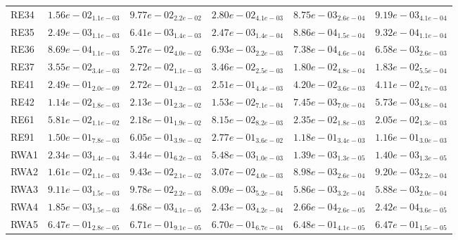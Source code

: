 \documentclass{article}
\begin{document}
\begin{table}
\begin{scriptsize}
\begin{tabular}{llllll}
RE34 & $  1.56e-02_{ 1.1e-03}$ & $  9.77e-02_{ 2.2e-02}$ & $  2.80e-02_{ 4.1e-03}$ & \cellcolor{gray95}$  8.75e-03_{ 2.6e-04}$ & \cellcolor{gray25}$  9.19e-03_{ 4.1e-04}$ \\
RE35 & $  2.49e-03_{ 1.1e-03}$ & $  6.41e-03_{ 1.4e-03}$ & $  2.47e-03_{ 1.4e-04}$ & \cellcolor{gray95}$  8.86e-04_{ 1.5e-04}$ & \cellcolor{gray25}$  9.32e-04_{ 1.1e-04}$ \\
RE36 & \cellcolor{gray25}$  8.69e-04_{ 1.1e-03}$ & $  5.27e-02_{ 4.0e-02}$ & $  6.93e-03_{ 2.2e-03}$ & \cellcolor{gray95}$  7.38e-04_{ 4.6e-04}$ & $  6.58e-03_{ 2.6e-03}$ \\
RE37 & $  3.55e-02_{ 3.4e-03}$ & $  2.72e-02_{ 1.1e-03}$ & $  3.46e-02_{ 2.5e-03}$ & \cellcolor{gray95}$  1.80e-02_{ 4.8e-04}$ & \cellcolor{gray25}$  1.83e-02_{ 5.5e-04}$ \\
RE41 & $  2.49e-01_{ 2.0e-09}$ & $  2.72e-01_{ 4.2e-03}$ & $  2.51e-01_{ 4.4e-03}$ & \cellcolor{gray25}$  4.20e-02_{ 3.6e-03}$ & \cellcolor{gray95}$  4.11e-02_{ 4.7e-03}$ \\
RE42 & $  1.14e-02_{ 1.8e-03}$ & $  2.13e-01_{ 2.3e-02}$ & $  1.53e-02_{ 7.1e-04}$ & \cellcolor{gray25}$  7.45e-03_{ 7.0e-04}$ & \cellcolor{gray95}$  5.73e-03_{ 4.8e-04}$ \\
RE61 & $  5.81e-02_{ 1.1e-02}$ & $  2.18e-01_{ 1.9e-02}$ & $  8.15e-02_{ 8.2e-03}$ & \cellcolor{gray25}$  2.35e-02_{ 1.8e-03}$ & \cellcolor{gray95}$  2.05e-02_{ 1.3e-03}$ \\
RE91 & $  1.50e-01_{ 7.8e-03}$ & $  6.05e-01_{ 3.9e-02}$ & $  2.77e-01_{ 3.6e-02}$ & \cellcolor{gray25}$  1.18e-01_{ 3.4e-03}$ & \cellcolor{gray95}$  1.16e-01_{ 3.0e-03}$ \\
RWA1 & $  2.34e-03_{ 1.4e-04}$ & $  3.44e-01_{ 6.2e-03}$ & $  5.48e-03_{ 1.0e-03}$ & \cellcolor{gray95}$  1.39e-03_{ 1.3e-05}$ & \cellcolor{gray25}$  1.40e-03_{ 1.3e-05}$ \\
RWA2 & $  1.61e-02_{ 1.1e-03}$ & $  9.43e-02_{ 2.1e-02}$ & $  3.07e-02_{ 4.0e-03}$ & \cellcolor{gray95}$  8.98e-03_{ 2.6e-04}$ & \cellcolor{gray25}$  9.20e-03_{ 2.2e-04}$ \\
RWA3 & $  9.11e-03_{ 1.5e-03}$ & $  9.78e-02_{ 2.2e-03}$ & $  8.09e-03_{ 5.2e-04}$ & \cellcolor{gray95}$  5.86e-03_{ 3.2e-04}$ & \cellcolor{gray25}$  5.88e-03_{ 2.0e-04}$ \\
RWA4 & $  1.85e-03_{ 1.5e-03}$ & $  4.68e-03_{ 4.1e-05}$ & $  2.43e-03_{ 4.2e-04}$ & \cellcolor{gray25}$  2.66e-04_{ 2.6e-05}$ & \cellcolor{gray95}$  2.42e-04_{ 3.6e-05}$ \\
RWA5 & \cellcolor{gray25}$  6.47e-01_{ 2.8e-05}$ & $  6.71e-01_{ 9.1e-05}$ & $  6.70e-01_{ 6.7e-04}$ & $  6.48e-01_{ 4.1e-05}$ & \cellcolor{gray95}$  6.47e-01_{ 1.5e-05}$ \\

\end{tabular}
\end{scriptsize}
\end{table}
\end{document}
